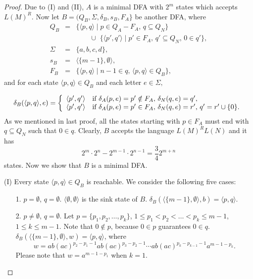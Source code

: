 \documentclass[10pt]{article}
\begin{document}
\begin{proof}
Due to (I) and (II), $A$ is a minimal DFA with $2^m$ states which
accepts $L(M)^R$. Now let $B=(Q_B, \Sigma , \delta_B , s_B, F_A\}$
be another DFA, where
\begin{eqnarray*}
Q_B & = & \{\langle p,q\rangle  \mid p\in Q_A-F_A \mbox{, }q\subseteq Q_N\}\\
& & \qquad \cup \,\, \{\langle p', q'\rangle \mid p'\in F_A \mbox{, }q'\subseteq Q_N\mbox{, }0\in q'\},\\
\Sigma & = & \{a,b,c,d\},\\
s_B & = & \langle \{m-1\},\emptyset \rangle,\\
F_B & = & \{\langle p,q\rangle \mid n-1\in q \mbox{, } \langle
p,q\rangle\in Q_B\},
\end{eqnarray*}
and for each state $\langle p,q\rangle\in Q_B$ and each letter $e\in
\Sigma,$

\begin{eqnarray*}
\delta_B(\langle p,q\rangle, e) = \left\{
\begin{array}{l l}
  \langle p',q'\rangle & \mbox{if }\delta_A(p, e)=p'\notin F_A\mbox{, } \delta_N(q, e)=q',\\
  \langle p',q'\rangle &  \mbox{if }\delta_A(p, e)=p'\in F_A\mbox{, }\delta_N(q, e)=r'\mbox{, $q' =r'\cup \{0\}$.}  \\
\end{array} \right.
\end{eqnarray*}
As we mentioned in last proof, all the states starting with $p\in
F_A$ must end with $q\subseteq Q_N$ such that $0\in q$. Clearly, $B$
accepts the language $L(M)^RL(N)$ and it has
$$2^m\cdot 2^n-2^{m-1}\cdot 2^{n-1}=\frac{3}{4}2^{m+n}$$
states. Now we show that $B$ is a minimal DFA.

(I) Every state $\langle p,q\rangle \in Q_B$ is reachable. We
consider the following five cases:

\begin{itemize}

\item[{\rm 1.}]$p=\emptyset$, $q=\emptyset$.
$\langle \emptyset,\emptyset\rangle$ is the sink state of $B$.
$\delta_B(\langle \{m-1\},\emptyset \rangle, b) = \langle
p,q\rangle$.

\item[{\rm 2.}]$p\neq \emptyset$, $q=\emptyset$.
Let $p=\{ p_1, p_2, \ldots ,p_k \}$, $1\leq p_1<p_2< \ldots <p_k
\leq m-1$, $1\leq k\leq m-1$. Note that $0\notin p$, because $0\in
p$ guarantees $0\in q$. $\delta_B(\langle \{m-1\},\emptyset \rangle,
w) = \langle p,q\rangle$, where
$$w = ab(ac)^{p_2-p_1-1}ab(ac)^{p_{3}-p_{2}-1}\cdots ab(ac)^{p_k-p_{k-1}-1}a^{m-1-p_k}.$$
Please note that $w=a^{m-1-p_1}$ when $k=1$.


\end{itemize}
\end{proof}
\end{document}
